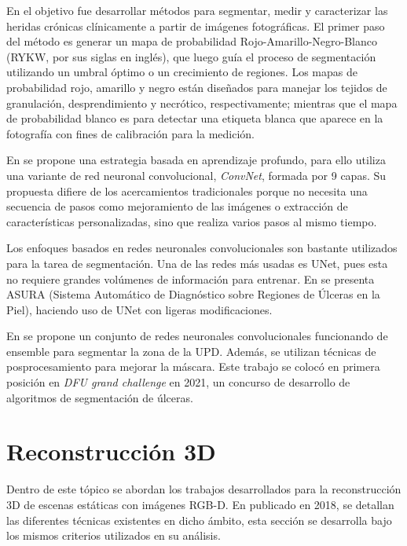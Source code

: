 En \cite{malian2004medphos} el objetivo fue desarrollar métodos para segmentar, medir y caracterizar las heridas crónicas clínicamente a partir de imágenes fotográficas. El primer paso del método es generar un mapa de probabilidad Rojo-Amarillo-Negro-Blanco (RYKW, por sus siglas en inglés), que luego guía el proceso de segmentación utilizando un umbral óptimo o un crecimiento de regiones. Los mapas de probabilidad rojo, amarillo y negro están diseñados para manejar los tejidos de granulación, desprendimiento y necrótico, respectivamente; mientras que el mapa de probabilidad blanco es para detectar una etiqueta blanca que aparece en la fotografía con fines de calibración para la medición.

En \cite{wang2015unified} se propone una estrategia basada en aprendizaje profundo, para ello utiliza una variante de red neuronal convolucional, \textit{ConvNet}, formada por 9 capas. Su propuesta difiere de los acercamientos tradicionales porque no necesita una secuencia de pasos como mejoramiento de las imágenes o extracción de características personalizadas, sino que realiza varios pasos al mismo tiempo.

Los enfoques basados en redes neuronales convolucionales son bastante utilizados para la tarea de segmentación. Una de las redes más usadas es UNet, pues esta no requiere grandes volúmenes de información para entrenar. En \cite{chino2020segmenting} se presenta ASURA (Sistema Automático de Diagnóstico sobre Regiones de Úlceras en la Piel), haciendo uso de UNet con ligeras modificaciones.

En \cite{mahbod2021automatic} se propone un conjunto de redes neuronales convolucionales funcionando de ensemble para segmentar la zona de la UPD. Además, se utilizan técnicas de posprocesamiento para mejorar la máscara. Este trabajo se colocó en primera posición en \textit{DFU grand challenge} en 2021, un concurso de desarrollo de algoritmos de segmentación de úlceras.

\section{Reconstrucción 3D}

Dentro de este tópico se abordan los trabajos desarrollados para la reconstrucción 3D de escenas estáticas con imágenes RGB-D. En \cite{zollhofer2018state} publicado en 2018, se detallan las diferentes técnicas existentes en dicho ámbito, esta sección se desarrolla bajo los mismos criterios utilizados en su análisis.


